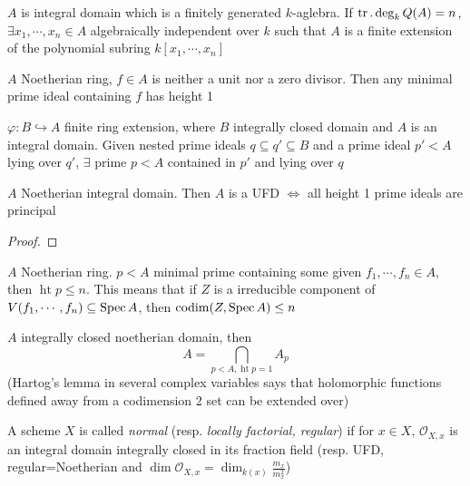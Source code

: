 \documentclass[main]{subfiles}
\begin{document}
\begin{theorem}\label{Noether normalization theorem}
$A$ is integral domain which is a finitely generated $k$-aglebra. If $\operatorname{tr}.\deg_kQ(A)=n$, $\exists x_1,\cdots,x_n\in A$ algebraically independent over $k$ such that $A$ is a finite extension of the polynomial subring $k[x_1,\cdots,x_n]$
\end{theorem}

\begin{theorem}\label{Krull's principal ideal theorem}
$A$ Noetherian ring, $f\in A$ is neither a unit nor a zero divisor. Then any minimal prime ideal containing $f$ has height 1
\end{theorem}

\begin{theorem}\label{Going down theorem}
$\varphi:B\hookrightarrow A$ finite ring extension, where $B$ integrally closed domain and $A$ is an integral domain. Given nested prime ideals $q\subseteq q'\subseteq B$ and a prime ideal $p'<A$ lying over $q'$, $\exists$ prime $p<A$ contained in $p'$ and lying over $q$
\end{theorem}

\begin{proposition}
$A$ Noetherian integral domain. Then $A$ is a UFD $\iff$ all height 1 prime ideals are principal
\end{proposition}

\begin{proof}

\end{proof}

\begin{theorem}\label{Krull's height theorem}
$A$ Noetherian ring. $p<A$ minimal prime containing some given $f_1,\cdots,f_n\in A$, then $\operatorname{ht}p\leq n$. This means that if $Z$ is a irreducible component of $V(f_1,\cdots,f_n)\subseteq\operatorname{Spec} A$, then $\operatorname{codim}(Z,\operatorname{Spec} A)\leq n$
\end{theorem}

\begin{lemma}\label{Algebraic Hartog's lemma}
$A$ integrally closed noetherian domain, then
\[
A=\bigcap_{p<A,\operatorname{ht}p=1}A_p
\]
(Hartog's lemma in several complex variables says that holomorphic functions defined away from a codimension 2 set can be extended over)
\end{lemma}

\begin{definition}
A scheme $X$ is called \textit{normal} (resp. \textit{locally factorial, regular}) if for $x\in X$, $\mathcal O_{X,x}$ is an integral domain integrally closed in its fraction field (resp. UFD, regular=Noetherian and $\dim\mathcal O_{X,x}=\dim_{k(x)}\frac{m_x}{m_x^2}$)
\end{definition}
\end{document}

